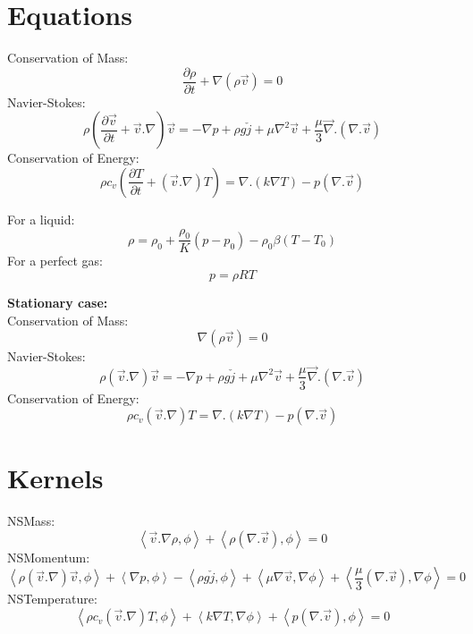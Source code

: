 \documentclass[11pt,letterpaper]{article}
\begin{document}
\section{Equations}

\noindent
Conservation of Mass:
\begin{equation}
\frac{\partial \rho}{\partial t} + \nabla (\rho \vec{v})=0
\end{equation}
Navier-Stokes:
\begin{equation}
\rho (\frac{\partial \vec{v}}{\partial t} + \vec{v}.\nabla)\vec{v} = - \nabla p + \rho g \check{j} + \mu \nabla^{2}\vec{v} + \frac{\mu}{3} \vec{\nabla}.(\nabla . \vec{v})
\end{equation}
Conservation of Energy:
\begin{equation}
\rho c_{v} (\frac{\partial T}{\partial t}+(\vec{v}.\nabla)T) = \nabla .(k\nabla T) - p (\nabla . \vec{v})
\end{equation}

\noindent
For a liquid:
\begin{equation}
\rho = \rho_{0} + \frac{\rho_{0}}{K}(p-p_{0}) - \rho_{0}\beta(T-T_{0})
\end{equation}
\noindent
For a perfect gas:
\begin{equation}
p = \rho R T
\end{equation}

\noindent
\textbf{Stationary case:}\\
Conservation of Mass:
\begin{equation}
\nabla (\rho \vec{v})=0
\end{equation}
Navier-Stokes:
\begin{equation}
\rho (\vec{v}.\nabla)\vec{v} = - \nabla p + \rho g \check{j} + \mu \nabla^{2}\vec{v} + \frac{\mu}{3} \vec{\nabla}.(\nabla . \vec{v})
\end{equation}
Conservation of Energy:
\begin{equation}
\rho c_{v} (\vec{v}.\nabla)T = \nabla .(k\nabla T) - p (\nabla . \vec{v})
\end{equation}

\section{Kernels}
\noindent
NSMass:
\begin{equation}
\left< \vec{v} . \nabla \rho, \phi \right> + \left< \rho (\nabla . \vec{v}), \phi \right> = 0
\end{equation}
NSMomentum:
\begin{equation}
\left< \rho (\vec{v}.\nabla)\vec{v}, \phi \right> + \left< \nabla p, \phi \right> - \left< \rho g \check{j}, \phi \right> + \left< \mu \nabla\vec{v}, \nabla \phi \right> + \left< \frac{\mu}{3} (\nabla . \vec{v}), \nabla \phi \right> = 0
\end{equation}
NSTemperature:
\begin{equation}
\left< \rho c_{v} (\vec{v}.\nabla)T, \phi \right> + \left< k \nabla T,\nabla \phi \right> + \left< p (\nabla . \vec{v}), \phi \right> = 0
\end{equation}
\end{document}
